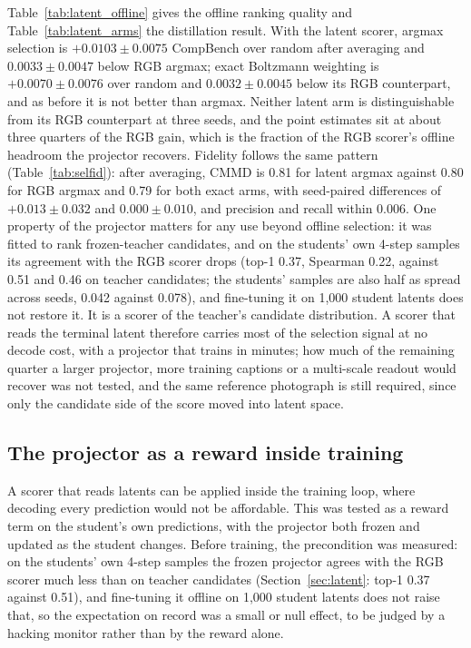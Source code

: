 \documentclass[11pt,a4paper]{article}
\begin{document}
Table~\ref{tab:latent_offline} gives the offline ranking quality and Table~\ref{tab:latent_arms} the distillation result. With the latent scorer, argmax selection is $+0.0103\pm0.0075$ CompBench over random after averaging and $0.0033\pm0.0047$ below RGB argmax; exact Boltzmann weighting is $+0.0070\pm0.0076$ over random and $0.0032\pm0.0045$ below its RGB counterpart, and as before it is not better than argmax. Neither latent arm is distinguishable from its RGB counterpart at three seeds, and the point estimates sit at about three quarters of the RGB gain, which is the fraction of the RGB scorer's offline headroom the projector recovers. Fidelity follows the same pattern (Table~\ref{tab:selfid}): after averaging, CMMD is 0.81 for latent argmax against 0.80 for RGB argmax and 0.79 for both exact arms, with seed-paired differences of $+0.013\pm0.032$ and $0.000\pm0.010$, and precision and recall within 0.006. One property of the projector matters for any use beyond offline selection: it was fitted to rank frozen-teacher candidates, and on the students' own 4-step samples its agreement with the RGB scorer drops (top-1 0.37, Spearman 0.22, against 0.51 and 0.46 on teacher candidates; the students' samples are also half as spread across seeds, 0.042 against 0.078), and fine-tuning it on 1,000 student latents does not restore it. It is a scorer of the teacher's candidate distribution. A scorer that reads the terminal latent therefore carries most of the selection signal at no decode cost, with a projector that trains in minutes; how much of the remaining quarter a larger projector, more training captions or a multi-scale readout would recover was not tested, and the same reference photograph is still required, since only the candidate side of the score moved into latent space.

\subsection{The projector as a reward inside training}
\label{sec:reward}
A scorer that reads latents can be applied inside the training loop, where decoding every prediction would not be affordable. This was tested as a reward term on the student's own predictions, with the projector both frozen and updated as the student changes. Before training, the precondition was measured: on the students' own 4-step samples the frozen projector agrees with the RGB scorer much less than on teacher candidates (Section~\ref{sec:latent}: top-1 0.37 against 0.51), and fine-tuning it offline on 1,000 student latents does not raise that, so the expectation on record was a small or null effect, to be judged by a hacking monitor rather than by the reward alone.
\end{document}
